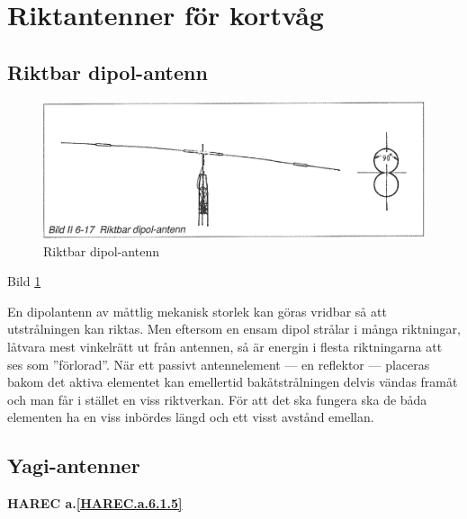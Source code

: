 \section{Riktantenner för kortvåg}

\subsection{Riktbar dipol-antenn}

\begin{figure}
  \includegraphics[width=\textwidth]{images/bild_2_6-17}
  \caption{Riktbar dipol-antenn}
  \label{fig:bildII6-17}
\end{figure}

Bild \ref{fig:bildII6-17}

En dipolantenn av måttlig mekanisk storlek kan göras vridbar så att
utstrålningen kan riktas. Men eftersom en ensam dipol strålar i många
riktningar, låtvara mest vinkelrätt ut från antennen, så är energin i
flesta riktningarna att ses som ''förlorad''. När ett passivt
antennelement --- en reflektor --- placeras bakom det aktiva elementet kan
emellertid bakåtstrålningen delvis vändas framåt och man får i stället
en viss riktverkan. För att det ska fungera ska de båda elementen
ha en viss inbördes längd och ett visst avstånd emellan.


\subsection{Yagi-antenner}
\textbf{
HAREC a.\ref{HAREC.a.6.1.5}\label{myHAREC.a.6.1.5}
}

